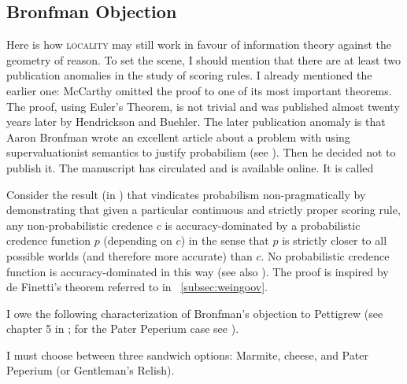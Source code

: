 \documentclass[12pt]{article}
\begin{document}
\subsection{Bronfman Objection}
\label{subsec:eemeingo}

Here is how \textsc{locality} may still work in favour of information
theory against the geometry of reason. To set the scene, I should
mention that there are at least two publication anomalies in the study
of scoring rules. I already mentioned the earlier one: McCarthy
omitted the proof to one of its most important theorems. The proof,
using Euler's Theorem, is not trivial and was published almost twenty
years later by Hendrickson and Buehler. The later publication anomaly
is that Aaron Bronfman wrote an excellent article about a problem with
using supervaluationist semantics to justify probabilism (see
). Then he decided not to publish it. The
manuscript has circulated and is available online. It is called


Consider the result (in ) that vindicates
probabilism non-pragmatically
by demonstrating that given a particular continuous and strictly
proper scoring rule, any non-probabilistic credence $c$ is
accuracy-dominated by a probabilistic credence function $p$ (depending
on $c$) in the sense that $p$ is strictly closer to all possible
worlds (and therefore more accurate) than $c$. No probabilistic
credence function is accuracy-dominated in this way (see also
). The proof is inspired by de Finetti's theorem
referred to in {\ubsection}~\ref{subsec:weingoov}.

I owe the following characterization of Bronfman's objection to
Pettigrew (see chapter 5 in ; for the Pater
Peperium case see ).


\begin{example}
  \label{ex:quuyaree}
  I must choose between three sandwich options: Marmite, cheese, and
  Pater Peperium (or Gentleman's Relish).
\end{example}
\end{document}
